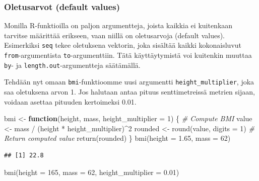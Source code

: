 \documentclass[
]{book}
\newenvironment{Shaded}{\begin{snugshade}}{\end{snugshade}}
\newcommand{\AttributeTok}[1]{\textcolor[rgb]{0.77,0.63,0.00}{#1}}
\newcommand{\CommentTok}[1]{\textcolor[rgb]{0.56,0.35,0.01}{\textit{#1}}}
\newcommand{\ControlFlowTok}[1]{\textcolor[rgb]{0.13,0.29,0.53}{\textbf{#1}}}
\newcommand{\DecValTok}[1]{\textcolor[rgb]{0.00,0.00,0.81}{#1}}
\newcommand{\FloatTok}[1]{\textcolor[rgb]{0.00,0.00,0.81}{#1}}
\newcommand{\FunctionTok}[1]{\textcolor[rgb]{0.00,0.00,0.00}{#1}}
\newcommand{\NormalTok}[1]{#1}
\newcommand{\OtherTok}[1]{\textcolor[rgb]{0.56,0.35,0.01}{#1}}
\newcommand{\SpecialCharTok}[1]{\textcolor[rgb]{0.00,0.00,0.00}{#1}}
\begin{document}
\hypertarget{oletusarvot-default-values}{%
\subsubsection{Oletusarvot (default values)}\label{oletusarvot-default-values}}

Monilla R-funktioilla on paljon argumentteja, joista kaikkia ei kuitenkaan tarvitse määrittää erikseen, vaan niillä on oletusarvoja (default values). Esimerkiksi \texttt{seq} tekee oletuksena vektorin, joka sisältää kaikki kokonaisluvut \texttt{from}-argumentista \texttt{to}-argumenttiin. Tätä käyttäytymistä voi kuitenkin muuttaa \texttt{by}- ja \texttt{length.out}-argumentteja säätämällä.

Tehdään nyt omaan \texttt{bmi}-funktioomme uusi argumentti \texttt{height\_multiplier}, joka saa oletuksena arvon 1. Jos halutaan antaa pituus senttimetreissä metrien sijaan, voidaan asettaa pituuden kertoimeksi 0.01.

\begin{Shaded}
\begin{Highlighting}[]
\NormalTok{bmi }\OtherTok{\textless{}{-}} \ControlFlowTok{function}\NormalTok{(height, mass, }\AttributeTok{height\_multiplier =} \DecValTok{1}\NormalTok{) \{}
  \CommentTok{\# Compute BMI}
\NormalTok{  value }\OtherTok{\textless{}{-}}\NormalTok{ mass }\SpecialCharTok{/}\NormalTok{ (height }\SpecialCharTok{*}\NormalTok{ height\_multiplier)}\SpecialCharTok{\^{}}\DecValTok{2}
\NormalTok{  rounded }\OtherTok{\textless{}{-}} \FunctionTok{round}\NormalTok{(value, }\AttributeTok{digits =} \DecValTok{1}\NormalTok{)}
  \CommentTok{\# Return computed value}
  \FunctionTok{return}\NormalTok{(rounded)}
\NormalTok{\}}
\FunctionTok{bmi}\NormalTok{(}\AttributeTok{height =} \FloatTok{1.65}\NormalTok{, }\AttributeTok{mass =} \DecValTok{62}\NormalTok{)}
\end{Highlighting}
\end{Shaded}

\begin{verbatim}
## [1] 22.8
\end{verbatim}

\begin{Shaded}
\begin{Highlighting}[]
\FunctionTok{bmi}\NormalTok{(}\AttributeTok{height =} \DecValTok{165}\NormalTok{, }\AttributeTok{mass =} \DecValTok{62}\NormalTok{, }\AttributeTok{height\_multiplier =} \FloatTok{0.01}\NormalTok{)}
\end{Highlighting}
\end{Shaded}
\end{document}
